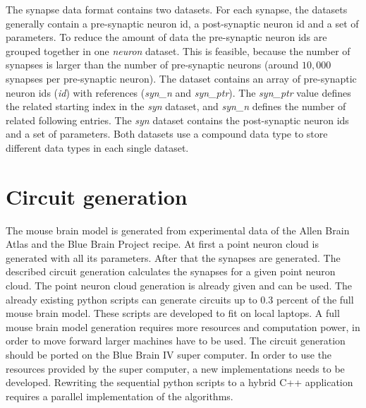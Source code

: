 The synapse data format contains two datasets. For each synapse, the datasets generally contain
a pre-synaptic neuron id, a post-synaptic neuron id and a set of parameters.
To reduce the amount of data the pre-synaptic neuron ids are grouped together in one \emph{neuron} dataset.
This is feasible, because
the number of synapses is larger than the number of pre-synaptic neurons (around $10,000$ synapses per pre-synaptic neuron).
The dataset contains an array of pre-synaptic neuron ids (\emph{id}) with references (\emph{syn\_n} and \emph{syn\_ptr}).
The \emph{syn\_ptr} value defines the related starting index in the \emph{syn} dataset,
and \emph{syn\_n} defines the number of related following entries.
The \emph{syn} dataset contains the post-synaptic neuron ids and a set of parameters.
Both datasets use a compound data type to store different data types in each single dataset.


\section{Circuit generation}
The mouse brain model is generated from experimental data of the Allen Brain Atlas and
the Blue Brain Project recipe.
At first a point neuron cloud is generated with all its parameters.
After that the synapses are generated.
The described circuit generation calculates the synapses for a given point neuron cloud.
The point neuron cloud generation is already given and can be used.
The already existing python scripts can generate circuits up to $0.3$ percent of the full mouse brain model.
These scripts are developed to fit on local laptops.
A full mouse brain model generation requires more resources and computation power, in order to move forward larger machines have to be used.
The circuit generation should be ported on the Blue Brain IV super computer.
In order to use the resources provided by the super computer, a new implementations needs to be developed. 
Rewriting the sequential python scripts to a hybrid C++ application requires a parallel implementation of the algorithms.




